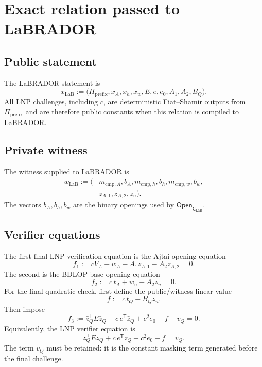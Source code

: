 \documentclass[11pt]{article}
\newcommand{\CLaB}{\mathsf C_{\mathrm{LaB}}}
\newcommand{\Open}{\mathsf{Open}}
\newcommand{\transpose}{\mathsf T}
\begin{document}
\section{Exact relation passed to LaBRADOR}

\subsection{Public statement}

The LaBRADOR statement is
\begin{equation}
\boxed{
 x_{\mathrm{LaB}}
 :=
 \bigl(
   \Pi_{\mathrm{prefix}},
   x_A,x_h,x_w,
   E,e,e_0,
   A_1,A_2,B_Q
 \bigr).
 }
 \label{eq:lab-statement}
\end{equation}
All LNP challenges, including $c$, are deterministic Fiat--Shamir outputs from
$\Pi_{\mathrm{prefix}}$ and are therefore public constants when this relation
is compiled to LaBRADOR.

\subsection{Private witness}

The witness supplied to LaBRADOR is
\begin{equation}
\boxed{
\begin{aligned}
 w_{\mathrm{LaB}}:=(&
 m_{\mathrm{cmp},A},b_A,
 m_{\mathrm{cmp},h},b_h,
 m_{\mathrm{cmp},w},b_w,\\
 &z_{A,1},z_{A,2},z_u
 ).
\end{aligned}}
\label{eq:lab-witness}
\end{equation}
The vectors $b_A,b_h,b_w$ are the binary openings used by
$\Open_{\CLaB}$.

\subsection{Verifier equations}

The first final LNP verification equation is the Ajtai opening equation
\begin{equation}
\boxed{
 f_1:=cV_A+w_A-A_1z_{A,1}-A_2z_{A,2}=0.
 }
 \label{eq:f1}
\end{equation}
The second is the BDLOP base-opening equation
\begin{equation}
\boxed{
 f_2:=c\,t_A+w_u-A_2z_u=0.
 }
 \label{eq:f2}
\end{equation}
For the final quadratic check, first define the public/witness-linear value
\begin{equation}
  f:=c\,t_Q-B_Qz_u.
  \label{eq:faux}
\end{equation}
Then impose
\begin{equation}
\boxed{
 f_3:=
 \bar z_Q^{\transpose}E\bar z_Q
 +c\,e^{\transpose}\bar z_Q
 +c^2e_0
 -f
 -v_Q
 =0.
 }
 \label{eq:f3}
\end{equation}
Equivalently, the LNP verifier equation is
\[
 \bar z_Q^{\transpose}E\bar z_Q
 +c\,e^{\transpose}\bar z_Q
 +c^2e_0-f=v_Q.
\]
The term $v_Q$ must be retained: it is the constant masking term generated
before the final challenge.
\end{document}
